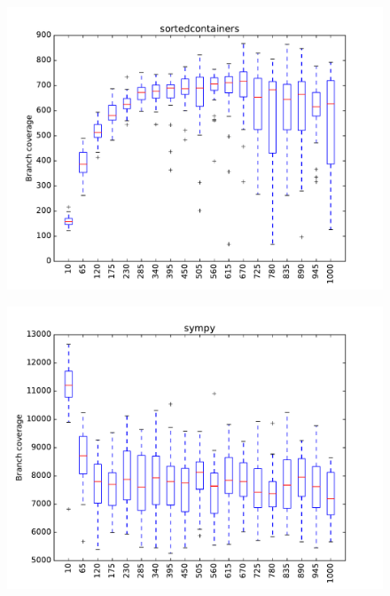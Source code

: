 \begin{figure}
\includegraphics[width=\columnwidth]{graphs/sortedcontainersrand120}
\end{figure}

\begin{figure}
\includegraphics[width=\columnwidth]{graphs/sympyrand120}
\end{figure}

